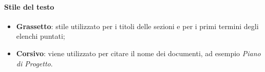 \paragraph{Stile del testo}
\begin{itemize} 
    \item \textbf{Grassetto}: stile utilizzato per i titoli delle sezioni e per i primi termini degli elenchi puntati;
    \item \textbf{Corsivo}: viene utilizzato per citare il nome dei documenti, ad esempio \textit{Piano di Progetto}. 
\end{itemize}
